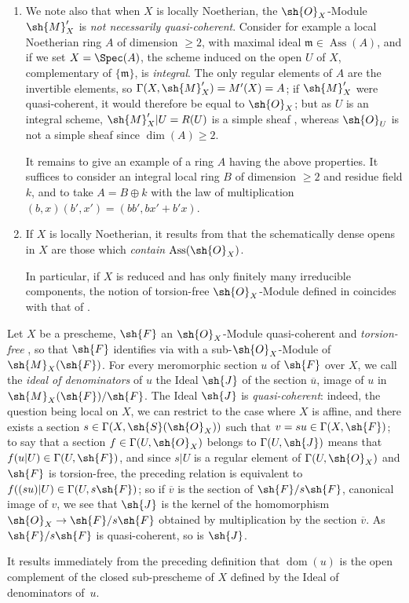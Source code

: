 \begin{remarks}[20.2.13]
\begin{enumerate}[label=(\roman*)]
  \item We note also that when $X$ is locally Noetherian, the $\sh{O}_X$-Module $\sh{M}'_X$ is \emph{not necessarily quasi-coherent}.
  Consider for example a local Noetherian ring $A$ of dimension $\geq 2$, with maximal ideal $\mathfrak{m}\in\operatorname{Ass}(A)$, and if we set $X=\Spec(A)$, the scheme induced on the open $U$ of $X$, complementary of $\{\mathfrak{m}\}$, is \emph{integral}.
  The only regular elements of $A$ are the invertible elements, so $\Gamma(X,\sh{M}'_X)=M'(X)=A$;
  if $\sh{M}'_X$ were quasi-coherent, it would therefore be equal to $\sh{O}_X$;
  but as $U$ is an integral scheme, $\sh{M}'_X|U=R(U)$ is a simple sheaf , whereas $\sh{O}_U$ is not a simple sheaf since $\dim(A)\geq 2$.

  It remains to give an example of a ring $A$ having the above properties.
  It suffices to consider an integral local ring $B$ of dimension $\geq 2$ and residue field $k$, and to take $A=B\oplus k$ with the law of multiplication $(b,x)(b',x')=(bb',bx'+b'x)$.

  \item If $X$ is locally Noetherian, it results from  that the schematically dense opens in $X$ are those which \emph{contain} $\operatorname{Ass}(\sh{O}_X)$.

  In particular, if $X$ is reduced and has only finitely many irreducible
  components, the notion of torsion-free $\sh{O}_X$-Module defined in
   coincides with that of .
\end{enumerate}
\end{remarks}

\begin{env}[20.2.14]
\label{IV.20.2.14}
Let $X$ be a prescheme, $\sh{F}$ an $\sh{O}_X$-Module quasi-coherent and \emph{torsion-free} , so that $\sh{F}$ identifies via  with a sub-$\sh{O}_X$-Module of $\sh{M}_X(\sh{F})$.
For every meromorphic section $u$ of $\sh{F}$ over $X$, we call the \emph{ideal of denominators} of $u$ the Ideal $\sh{J}$ of the section $\overline{u}$, image of $u$ in $\sh{M}_X(\sh{F})/\sh{F}$.
The Ideal $\sh{J}$ is \emph{quasi-coherent}:
indeed, the question being local on $X$, we can restrict to the case where $X$ is affine, and there exists a section $s\in\Gamma(X,\sh{S}(\sh{O}_X))$ such that $v=su\in\Gamma(X,\sh{F})$;
to say that a section $f\in\Gamma(U,\sh{O}_X)$ belongs to $\Gamma(U,\sh{J})$ means that $f(u|U)\in\Gamma(U,\sh{F})$, and since $s|U$ is a regular element of $\Gamma(U,\sh{O}_X)$ and $\sh{F}$ is torsion-free, the preceding relation is equivalent to $f((su)|U)\in\Gamma(U,s\sh{F})$;
so if $\overline{v}$ is the section of $\sh{F}/s\sh{F}$, canonical image of $v$, we see that $\sh{J}$ is the kernel of the homomorphism $\sh{O}_X\to\sh{F}/s\sh{F}$ obtained by multiplication by the section $\overline{v}$.
As $\sh{F}/s\sh{F}$ is quasi-coherent, so is $\sh{J}$.

It results immediately from the preceding definition that $\operatorname{dom}(u)$ is the open complement of the closed sub-prescheme of $X$ defined by the Ideal of denominators of~$u$.
\end{env}

